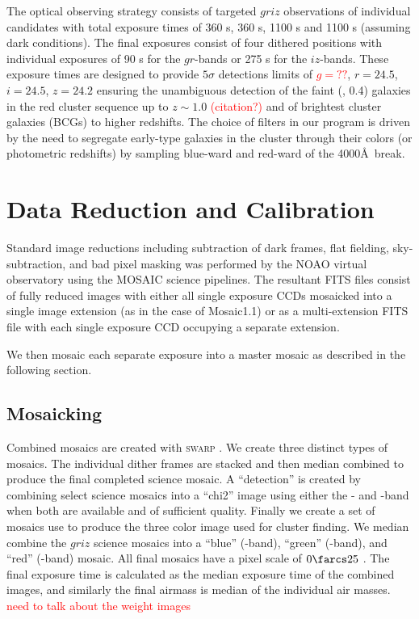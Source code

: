 \documentclass[apj, revtex4-1]{emulateapj}
\newcommand{\editorial}[1]{\textcolor{red}{#1}}
\begin{document}
The optical observing strategy consists of targeted $griz$ observations of individual candidates with total exposure times of 360 s, 360 s, 1100 s and 1100 s (assuming dark conditions). The final exposures consist of four dithered positions with individual exposures of 90 s for the $gr$-bands or 275 s for the $iz$-bands. These exposure times are designed to provide $5\sigma$ detections limits of \editorial{$g=??$}, $r = 24.5$, $i = 24.5$, $z = 24.2$ ensuring the unambiguous detection of the faint (\ie, 0.4\lstar) galaxies in the red cluster sequence up to $z \sim 1.0$ \editorial{(citation?)} and of brightest cluster galaxies (BCGs) to higher redshifts. The choice of filters in our program is driven by the need to segregate early-type galaxies in the cluster through their colors (or photometric redshifts) by sampling blue-ward and red-ward of the 4000\AA\ break.

\section{Data Reduction and Calibration}\label{sec:data reduction}
Standard image reductions including subtraction of dark frames, flat fielding, sky-subtraction, and bad pixel masking was performed by the NOAO virtual observatory using the MOSAIC \citep{Valdes2007} science pipelines. The resultant FITS files consist of fully reduced images with either all single exposure CCDs mosaicked into a single image extension (as in the case of Mosaic1.1) or as a multi-extension FITS file with each single exposure CCD occupying a separate extension.

We then mosaic each separate exposure into a master mosaic as described in the following section.

\subsection{Mosaicking}\label{sec:mosaicks}
Combined mosaics are created with \textsc{swarp} \citep{Bertin2002}. We create three distinct types of mosaics. The individual dither frames are stacked and then median combined to produce the final completed science mosaic. A ``detection'' is created by combining select science mosaics into a ``chi2'' image using either the \sdssi- and \sdssz-band when both are available and of sufficient quality. Finally we create a set of mosaics use to produce the three color image used for cluster finding. We median combine the $griz$ science mosaics into a ``blue'' (\sdssg-band), ``green'' (\sdssr-band), and ``red'' (\sdssi\sdssz-band) mosaic. All final mosaics have a pixel scale of $0\farcs25$ \perpixel. The final exposure time is calculated as the median exposure time of the combined images, and similarly the final airmass is median of the individual air masses. \editorial{need to talk about the weight images}
\end{document}
